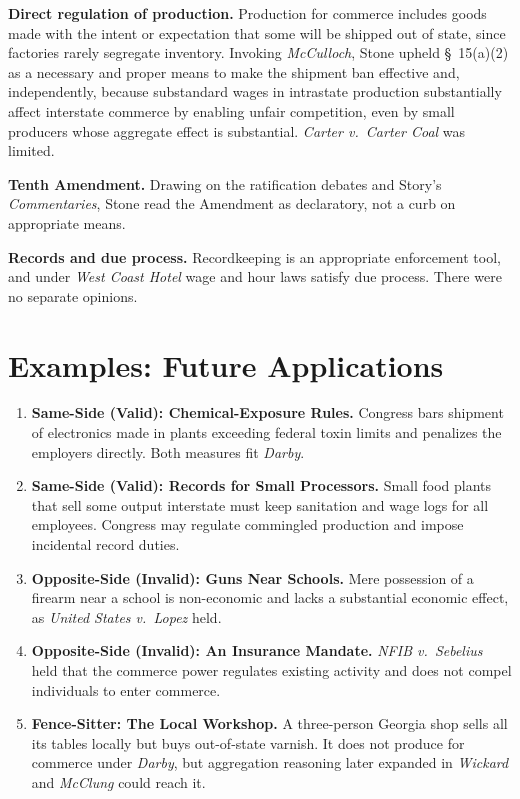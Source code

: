 \documentclass[12pt]{article}
\begin{document}
\textbf{Direct regulation of production.} Production for commerce includes goods made with the intent or expectation that some will be shipped out of state, since factories rarely segregate inventory. Invoking \textit{McCulloch}, Stone upheld \S~15(a)(2) as a necessary and proper means to make the shipment ban effective and, independently, because substandard wages in intrastate production substantially affect interstate commerce by enabling unfair competition, even by small producers whose aggregate effect is substantial. \textit{Carter v.\ Carter Coal} was limited.

\textbf{Tenth Amendment.} Drawing on the ratification debates and Story's \textit{Commentaries}, Stone read the Amendment as declaratory, not a curb on appropriate means.

\textbf{Records and due process.} Recordkeeping is an appropriate enforcement tool, and under \textit{West Coast Hotel} wage and hour laws satisfy due process. There were no separate opinions.

\section{Examples: Future Applications}

\begin{enumerate}
\item \textbf{Same-Side (Valid): Chemical-Exposure Rules.} Congress bars shipment of electronics made in plants exceeding federal toxin limits and penalizes the employers directly. Both measures fit \textit{Darby}.
\item \textbf{Same-Side (Valid): Records for Small Processors.} Small food plants that sell some output interstate must keep sanitation and wage logs for all employees. Congress may regulate commingled production and impose incidental record duties.
\item \textbf{Opposite-Side (Invalid): Guns Near Schools.} Mere possession of a firearm near a school is non-economic and lacks a substantial economic effect, as \textit{United States v.\ Lopez} held.
\item \textbf{Opposite-Side (Invalid): An Insurance Mandate.} \textit{NFIB v.\ Sebelius} held that the commerce power regulates existing activity and does not compel individuals to enter commerce.
\item \textbf{Fence-Sitter: The Local Workshop.} A three-person Georgia shop sells all its tables locally but buys out-of-state varnish. It does not produce for commerce under \textit{Darby}, but aggregation reasoning later expanded in \textit{Wickard} and \textit{McClung} could reach it.
\end{enumerate}
\end{document}
